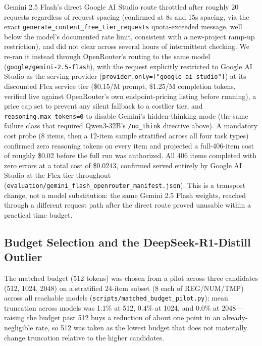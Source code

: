 Gemini 2.5 Flash's direct Google AI Studio route throttled after roughly 20 requests regardless of
request spacing (confirmed at 8s and 15s spacing, via the exact
\texttt{generate\_content\_free\_tier\_requests} quota-exceeded message, well below the model's
documented rate limit, consistent with a new-project ramp-up restriction), and did not clear across
several hours of intermittent checking. We re-ran it instead through OpenRouter's routing to the
same model (\texttt{google/gemini-2.5-flash}), with the request explicitly restricted to Google AI
Studio as the serving provider (\texttt{provider.only=["google-ai-studio"]}) at its discounted
Flex service tier (\$0.15/M prompt, \$1.25/M completion tokens, verified live against OpenRouter's
own endpoint-pricing listing before running), a price cap set to prevent any silent fallback to a
costlier tier, and \texttt{reasoning.max\_tokens=0} to disable Gemini's hidden-thinking mode (the
same failure class that required Qwen3-32B's \texttt{/no\_think} directive above). A mandatory cost
probe (8 items, then a 12-item sample stratified across all four task types) confirmed zero
reasoning tokens on every item and projected a full-406-item cost of roughly \$0.02 before the full
run was authorized. All 406 items completed with zero errors at a total cost of \$0.0243, confirmed
served entirely by Google AI Studio at the Flex tier throughout
(\texttt{evaluation/gemini\_flash\_openrouter\_manifest.json}). This is a transport change, not a
model substitution: the same Gemini 2.5 Flash weights, reached through a different request path
after the direct route proved unusable within a practical time budget.

\subsection{Budget Selection and the DeepSeek-R1-Distill Outlier}
\label{app:budget-outlier}

The matched budget (512 tokens) was chosen from a pilot across three candidates (512, 1024, 2048) on
a stratified 24-item subset (8 each of REG/NUM/TMP) across all reachable models
(\texttt{scripts/matched\_budget\_pilot.py}): mean truncation across models was 1.1\% at 512, 0.4\% at
1024, and 0.0\% at 2048---raising the budget past 512 buys a reduction of about one point in an
already-negligible rate, so 512 was taken as the lowest budget that does not materially change
truncation relative to the higher candidates.

